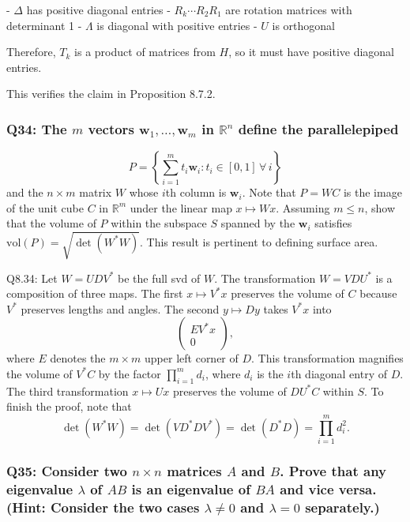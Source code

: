 \documentclass[8pt]{article}
\begin{document}
{   - $\Delta$ has positive diagonal entries
   - $R_k \cdots R_2 R_1$ are rotation matrices with determinant 1
   - $\Lambda$ is diagonal with positive entries
   - $U$ is orthogonal
   
   Therefore, $T_k$ is a product of matrices from $H$, so it must have positive diagonal entries.

This verifies the claim in Proposition 8.7.2.

\subsubsection*{Q34: The \(m\) vectors \(\mathbf{w}_1, \ldots, \mathbf{w}_m\) in \(\mathbb{R}^n\) define the parallelepiped}

\[ P = \left\{ \sum_{i=1}^m t_i \mathbf{w}_i : t_i \in [0, 1] \, \forall \, i \right\} \]
and the \(n \times m\) matrix \(W\) whose \(i\)th column is \(\mathbf{w}_i\). Note that \(P = WC\) is the image of the unit cube \(C\) in \(\mathbb{R}^m\) under the linear map \(x \mapsto Wx\). Assuming \(m \leq n\), show that the volume of \(P\) within the subspace \(S\) spanned by the \(\mathbf{w}_i\) satisfies \(\text{vol}(P) = \sqrt{\det(W^*W)}\). This result is pertinent to defining surface area.

Q8.34: Let \(W = UDV^*\) be the full svd of \(W\). The transformation \(W = VDU^*\) is a composition of three maps. The first \(x \mapsto V^* x\) preserves the volume of \(C\) because \(V^*\) preserves lengths and angles. The second \(y \mapsto Dy\) takes \(V^* x\) into
\[
\begin{pmatrix}
EV^* x \\
0
\end{pmatrix},
\]
where \(E\) denotes the \(m \times m\) upper left corner of \(D\). This transformation magnifies the volume of \(V^* C\) by the factor \(\prod_{i=1}^m d_i\), where \(d_i\) is the \(i\)th diagonal entry of \(D\). The third transformation \(x \mapsto Ux\) preserves the volume of \(DU^* C\) within \(S\). To finish the proof, note that
\[
\det(W^* W) = \det(VD^* DV^*) = \det(D^* D) = \prod_{i=1}^m d_i^2.
\]

\subsubsection*{Q35: Consider two \(n \times n\) matrices \(A\) and \(B\). Prove that any eigenvalue \(\lambda\) of \(AB\) is an eigenvalue of \(BA\) and vice versa. (Hint: Consider the two cases \(\lambda \neq 0\) and \(\lambda = 0\) separately.)}

}
\end{document}
